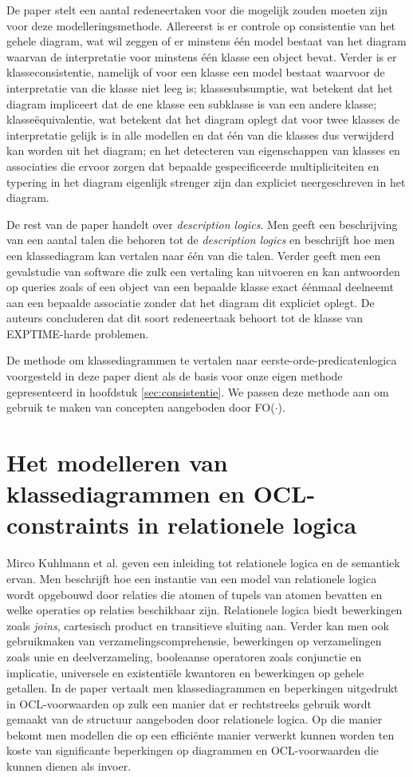 De paper stelt een aantal redeneertaken voor die mogelijk zouden moeten zijn voor deze modelleringsmethode. Allereerst is er controle op consistentie van het gehele diagram, wat wil zeggen of er minstens \'e\'en model bestaat van het diagram waarvan de interpretatie voor minstens \'e\'en klasse een object bevat. Verder is er klasseconsistentie, namelijk of voor een klasse een model bestaat waarvoor de interpretatie van die klasse niet leeg is; klassesubsumptie, wat betekent dat het diagram impliceert dat de ene klasse een subklasse is van een andere klasse; klasse\"equivalentie, wat betekent dat het diagram oplegt dat voor twee klasses de interpretatie gelijk is in alle modellen en dat \'e\'en van die klasses dus verwijderd kan worden uit het diagram; en het detecteren van eigenschappen van klasses en associaties die ervoor zorgen dat bepaalde gespecificeerde multipliciteiten en typering in het diagram eigenlijk strenger zijn dan expliciet neergeschreven in het diagram.

De rest van de paper handelt over \textit{description logics}. Men geeft een beschrijving van een aantal talen die behoren tot de \textit{description logics} en beschrijft hoe men een klassediagram kan vertalen naar \'e\'en van die talen. Verder geeft men een gevalstudie van software die zulk een vertaling kan uitvoeren en kan antwoorden op queries zoals of een object van een bepaalde klasse exact \'e\'enmaal deelneemt aan een bepaalde associatie zonder dat het diagram dit expliciet oplegt. De auteurs concluderen dat dit soort redeneertaak behoort tot de klasse van EXPTIME-harde problemen.

De methode om klassediagrammen te vertalen naar eerste-orde-predicatenlogica voorgesteld in deze paper dient als de basis voor onze eigen methode gepresenteerd in hoofdstuk \ref{sec:consistentie}. We passen deze methode aan om gebruik te maken van concepten aangeboden door FO($\cdot$)\cite{DeCatBroes2014PLaa}.

\section{Het modelleren van klassediagrammen en OCL-constraints in relationele logica}
Mirco Kuhlmann et al.\cite{KuhlmannMirco2012FUaO} geven een inleiding tot relationele logica en de semantiek ervan. Men beschrijft hoe een instantie van een model van relationele logica wordt opgebouwd door relaties die atomen of tupels van atomen bevatten en welke operaties op relaties beschikbaar zijn. Relationele logica biedt bewerkingen zoals \textit{joins}, cartesisch product en transitieve sluiting aan. Verder kan men ook gebruikmaken van verzamelingscomprehensie, bewerkingen op verzamelingen zoals unie en deelverzameling, booleaanse operatoren zoals conjunctie en implicatie, universele en existenti\"ele kwantoren en bewerkingen op gehele getallen. In de paper vertaalt men klassediagrammen en beperkingen uitgedrukt in OCL-voorwaarden\cite{WarmerJosB1999Ocl:} op zulk een manier dat er rechtstreeks gebruik wordt gemaakt van de structuur aangeboden door relationele logica. Op die manier bekomt men modellen die op een effici\"ente manier verwerkt kunnen worden ten koste van significante beperkingen op diagrammen en OCL-voorwaarden die kunnen dienen als invoer.


